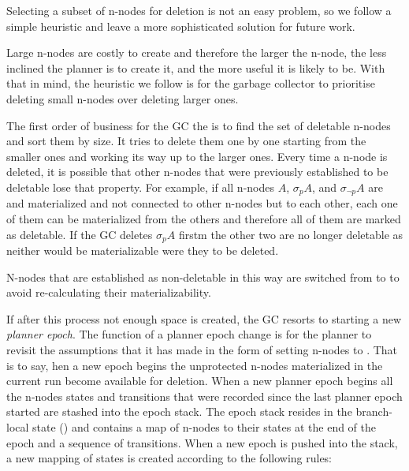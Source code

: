 Selecting a subset of n-nodes for deletion is not an easy problem, so we follow a
simple heuristic and leave a more sophisticated solution for future work.

%
%
Large n-nodes are costly to create and therefore the larger the n-node,
the less inclined the planner is to create it, and the more useful it
is likely to be. With that in mind, the heuristic we follow is for the
garbage collector to prioritise deleting small n-nodes over deleting
larger ones.

The first order of business for the GC the is to find the set of
deletable n-nodes and sort them by size. It tries to delete them one by
one starting from the smaller ones and working its way up to the
larger ones. Every time a n-node is deleted, it is possible that other
n-nodes that were previously established to be deletable lose that
property. For example, if all n-nodes \(A\), \(\sigma_p A\), and
\(\sigma_{\neg p} A\) are  and materialized and not
connected to other n-nodes but to each other, each one of
them can be materialized from the others and therefore all of them are
marked as deletable. If the GC deletes \(\sigma_p A\) firstm the other
two are no longer deletable as neither would be materializable were they
to be deleted.

N-nodes that are established as non-deletable in this way are switched
from  to  to avoid re-calculating their
materializability.

If after this process not enough space is created, the GC resorts to
starting a new \emph{planner epoch}. The function of a planner epoch
change is for the planner to revisit the assumptions that it has made in
the form of setting n-nodes to . That is to say, hen a new
epoch begins the unprotected n-nodes materialized in the current run
become available for deletion. When a new planner epoch begins all the
n-nodes states and transitions that were recorded since the last planner
epoch started are stashed into the epoch stack. The epoch stack
resides in the branch-local state () and contains a map
of n-nodes to their states at the end of the epoch and a sequence of
transitions. When a new epoch is pushed into the stack, a new mapping
of states is created according to the following rules:

